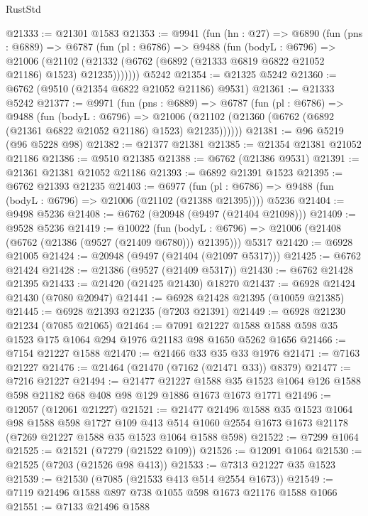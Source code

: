 \begin{lexlean}{RustStd}
\begin{coremodule}
@21333 := @21301 @1583
@21353 := @9941
    (fun (hn : @27) =>
    @6890
      (fun (pns : @6889) =>
      @6787
        (fun (pl : @6786) =>
        @9488
          (fun (bodyL : @6796) =>
          @21006
            (@21102 (@21332 (@6762 (@6892 (@21333 @6819 @6822 @21052 @21186) @1523) @21235)))))))
    @5242
@21354 := @21325 @5242
@21360 := @6762 (@9510 (@21354 @6822 @21052 @21186) @9531)
@21361 := @21333 @5242
@21377 := @9971
    (fun (pns : @6889) =>
    @6787
      (fun (pl : @6786) =>
      @9488
        (fun (bodyL : @6796) =>
        @21006 (@21102 (@21360 (@6762 (@6892 (@21361 @6822 @21052 @21186) @1523) @21235))))))
@21381 := @96 @5219 (@96 @5228 @98)
@21382 := @21377 @21381
@21385 := @21354 @21381 @21052 @21186
@21386 := @9510 @21385
@21388 := @6762 (@21386 @9531)
@21391 := @21361 @21381 @21052 @21186
@21393 := @6892 @21391 @1523
@21395 := @6762 @21393 @21235
@21403 := @6977
    (fun (pl : @6786) => @9488 (fun (bodyL : @6796) => @21006 (@21102 (@21388 @21395))))
    @5236
@21404 := @9498 @5236
@21408 := @6762 (@20948 (@9497 (@21404 @21098)))
@21409 := @9528 @5236
@21419 := @10022
    (fun (bodyL : @6796) => @21006 (@21408 (@6762 (@21386 (@9527 (@21409 @6780))) @21395)))
    @5317
@21420 := @6928 @21005
@21424 := @20948 (@9497 (@21404 (@21097 @5317)))
@21425 := @6762 @21424
@21428 := @21386 (@9527 (@21409 @5317))
@21430 := @6762 @21428 @21395
@21433 := @21420 (@21425 @21430) @18270
@21437 := @6928 @21424 @21430 (@7080 @20947)
@21441 := @6928 @21428 @21395 (@10059 @21385)
@21445 := @6928 @21393 @21235 (@7203 @21391)
@21449 := @6928 @21230 @21234 (@7085 @21065)
@21464 := @7091 @21227 @1588 @1588 @598 @35 @1523 @175 @1064 @294 @1976 @21183 @98 @1650 @5262 @1656
@21466 := @7154 @21227 @1588
@21470 := @21466 @33 @35 @33 @1976
@21471 := @7163 @21227
@21476 := @21464 (@21470 (@7162 (@21471 @33)) @8379)
@21477 := @7216 @21227
@21494 := @21477
    @21227
    @1588
    @35
    @1523
    @1064
    @126
    @1588
    @598
    @21182
    @68
    @408
    @98
    @129
    @1886
    @1673
    @1673
    @1771
@21496 := @12057 (@12061 @21227)
@21521 := @21477
    @21496
    @1588
    @35
    @1523
    @1064
    @98
    @1588
    @598
    @1727
    @109
    @413
    @514
    @1060
    @2554
    @1673
    @1673
    @21178
    (@7269 @21227 @1588 @35 @1523 @1064 @1588 @598)
@21522 := @7299 @1064
@21525 := @21521 (@7279 (@21522 @109))
@21526 := @12091 @1064
@21530 := @21525 (@7203 (@21526 @98 @413))
@21533 := @7313 @21227 @35 @1523
@21539 := @21530 (@7085 (@21533 @413 @514 @2554 @1673))
@21549 := @7119 @21496 @1588 @897 @738 @1055 @598 @1673 @21176 @1588 @1066
@21551 := @7133 @21496 @1588

\end{coremodule}
\end{lexlean}
